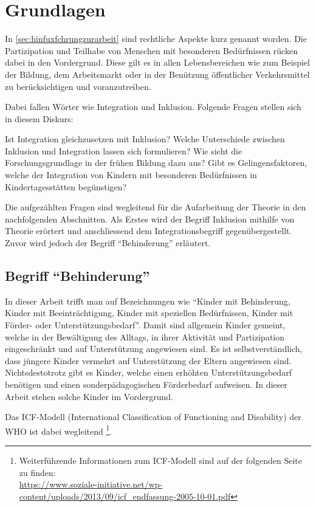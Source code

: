 \documentclass[
  ngerman,
  11pt,
  paper=a4,
  twoside,
  titlepage=true,
  openright,
  abstract=on,
  toc=listofnumbered,
  numbers=noenddot,
  chapterprefix=true,
  headings=optiontohead,
  svgnames,
  dvipsnames]{scrreprt}
\begin{document}
\hypertarget{sec:grundlagen}{%
\chapter{Grundlagen}\label{sec:grundlagen}}

In \cref{sec:hinfuxfchrungzurarbeit} sind rechtliche Aspekte kurz
genannt worden. Die Partizipation und Teilhabe von Menschen mit
besonderen Bedürfnissen rücken dabei in den Vordergrund. Diese gilt es
in allen Lebensbereichen wie zum Beispiel der Bildung, dem Arbeitsmarkt
oder in der Benützung öffentlicher Verkehrsmittel zu berücksichtigen und
voranzutreiben.

Dabei fallen Wörter wie Integration und Inklusion. Folgende Fragen
stellen sich in diesem Diskurs:

Ist Integration gleichzusetzen mit Inklusion? Welche Unterschiede
zwischen Inklusion und Integration lassen sich formulieren? Wie sieht
die Forschungsgrundlage in der frühen Bildung dazu aus? Gibt es
Gelingensfaktoren, welche der Integration von Kindern mit besonderen
Bedürfnissen in Kindertagesstätten begünstigen?

Die aufgezählten Fragen sind wegleitend für die Aufarbeitung der Theorie
in den nachfolgenden Abschnitten. Als Erstes wird der Begriff Inklusion
mithilfe von Theorie erörtert und anschliessend dem Integrationsbegriff
gegenübergestellt. Zuvor wird jedoch der Begriff “Behinderung”
erläutert.

\hypertarget{begriff-behinderung}{%
\section{Begriff “Behinderung”}\label{begriff-behinderung}}

In dieser Arbeit trifft man auf Bezeichnungen wie “Kinder mit
Behinderung, Kinder mit Beeinträchtigung, Kinder mit speziellen
Bedürfnissen, Kinder mit Förder- oder Unterstützungsbedarf”. Damit sind
allgemein Kinder gemeint, welche in der Bewältigung des Alltags, in
ihrer Aktivität und Partizipation eingeschränkt und auf Unterstützung
angewiesen sind. Es ist selbstverständlich, dass jüngere Kinder vermehrt
auf Unterstützung der Eltern angewiesen sind. Nichtsdestotrotz gibt es
Kinder, welche einen erhöhten Unterstützungsbedarf benötigen und einen
sonderpädagogischen Förderbedarf aufweisen. In dieser Arbeit stehen
solche Kinder im Vordergrund.

Das ICF-Modell (International Classification of Functioning and
Disability) der WHO ist dabei wegleitend \footnote{Weiterführende
  Informationen zum ICF-Modell sind auf der folgenden Seite zu finden:\\
  \url{https://www.soziale-initiative.net/wp-content/uploads/2013/09/icf_endfassung-2005-10-01.pdf}}.
\end{document}
